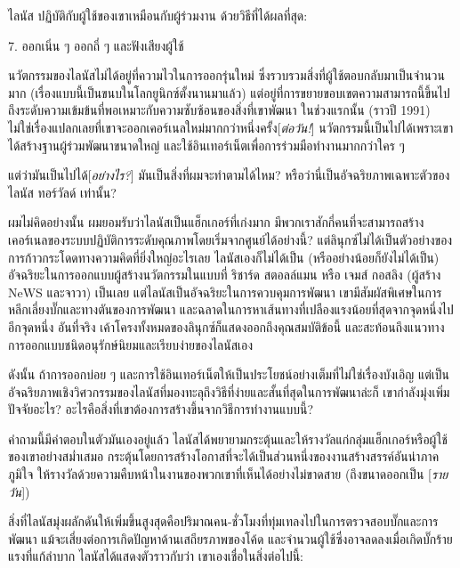 \noindent ไลนัส ปฏิบัติกับผู้ใช้ของเขาเหมือนกับผู้ร่วมงาน ด้วยวิธีที่ได้ผลที่สุด:

\begin{fancyquotes}
  7. ออกเนิ่น  ๆ   ออกถี่  ๆ   และฟังเสียงผู้ใช้
\end{fancyquotes}

นวัตกรรมของไลนัสไม่ได้อยู่ที่ความไวในการออกรุ่นใหม่
ซึ่งรวบรวมสิ่งที่ผู้ใช้ตอบกลับมาเป็นจำนวนมาก
(เรื่องแบบนี้เป็นขนบในโลกยูนิกซ์ตั้งนานมาแล้ว)
แต่อยู่ที่การขยายขอบเขตความสามารถนี้ขึ้นไปถึงระดับความเข้มข้นที่พอเหมาะกับความซับซ้อนของสิ่งที่เขาพัฒนา
ในช่วงแรกนั้น (ราวปี 1991)
ไม่ใช่เรื่องแปลกเลยที่เขาจะออกเคอร์เนลใหม่มากกว่าหนึ่งครั้ง{[}\emph{ต่อวัน!}{]}
นวัตกรรมนี้เป็นไปได้เพราะเขาได้สร้างฐานผู้ร่วมพัฒนาขนาดใหญ่
และใช้อินเทอร์เน็ตเพื่อการร่วมมือทำงานมากกว่าใคร  ๆ

แต่ว่ามันเป็นไปได้{[}\emph{อย่างไร?}{]} มันเป็นสิ่งที่ผมจะทำตามได้ไหม?
หรือว่านี่เป็นอัจฉริยภาพเฉพาะตัวของ ไลนัส ทอร์วัลด์ เท่านั้น?

ผมไม่คิดอย่างนั้น ผมยอมรับว่าไลนัสเป็นแฮ็กเกอร์ที่เก่งมาก
มีพวกเราสักกี่คนที่จะสามารถสร้างเคอร์เนลของระบบปฏิบัติการระดับคุณภาพโดยเริ่มจากศูนย์ได้อย่างนี้?
แต่ลินุกซ์ไม่ได้เป็นตัวอย่างของการก้าวกระโดดทางความคิดที่ยิ่งใหญ่อะไรเลย
ไลนัสเองก็ไม่ได้เป็น (หรืออย่างน้อยก็ยังไม่ได้เป็น)
อัจฉริยะในการออกแบบผู้สร้างนวัตกรรมในแบบที่ ริชาร์ด สตอลล์แมน หรือ เจมส์
กอสลิง (ผู้สร้าง NeWS และจาวา) เป็นเลย
แต่ไลนัสเป็นอัจฉริยะในการควบคุมการพัฒนา
เขามีสัมผัสพิเศษในการหลีกเลี่ยงบั๊กและทางตันของการพัฒนา
และฉลาดในการหาเส้นทางที่เปลืองแรงน้อยที่สุดจากจุดหนึ่งไปอีกจุดหนึ่ง
อันที่จริง เค้าโครงทั้งหมดของลินุกซ์ก็แสดงออกถึงคุณสมบัติข้อนี้
และสะท้อนถึงแนวทางการออกแบบชนิดอนุรักษ์นิยมและเรียบง่ายของไลนัสเอง

ดังนั้น ถ้าการออกบ่อย  ๆ
และการใช้อินเทอร์เน็ตให้เป็นประโยชน์อย่างเต็มที่ไม่ใช่เรื่องบังเอิญ
แต่เป็นอัจฉริยภาพเชิงวิศวกรรมของไลนัสที่มองทะลุถึงวิธีที่ง่ายและสั้นที่สุดในการพัฒนาล่ะก็
เขากำลังมุ่งเพิ่มปัจจัยอะไร?
อะไรคือสิ่งที่เขาต้องการสร้างขึ้นจากวิธีการทำงานแบบนี้?

คำถามนี้มีคำตอบในตัวมันเองอยู่แล้ว
ไลนัสได้พยายามกระตุ้นและให้รางวัลแก่กลุ่มแฮ็กเกอร์หรือผู้ใช้ของเขาอย่างสม่ำเสมอ
กระตุ้นโดยการสร้างโอกาสที่จะได้เป็นส่วนหนึ่งของงานสร้างสรรค์อันน่าภาคภูมิใจ
ให้รางวัลด้วยความคืบหน้าในงานของพวกเขาที่เห็นได้อย่างไม่ขาดสาย
(ถึงขนาดออกเป็น {[}\emph{รายวัน}{]})

สิ่งที่ไลนัสมุ่งผลักดันให้เพิ่มขึ้นสูงสุดคือปริมาณคน-ชั่วโมงที่ทุ่มเทลงไปในการตรวจสอบบั๊กและการพัฒนา
แม้จะเสี่ยงต่อการเกิดปัญหาด้านเสถียรภาพของโค้ด
และจำนวนผู้ใช้ซึ่งอาจลดลงเมื่อเกิดบั๊กร้ายแรงที่แก้ลำบาก
ไลนัสได้แสดงตัวราวกับว่า เขาเองเชื่อในสิ่งต่อไปนี้:

